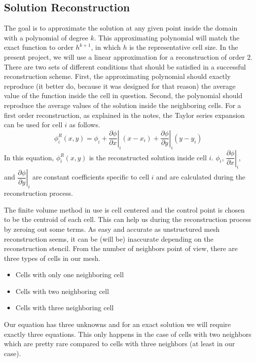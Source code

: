 \documentclass{article}
\begin{document}
\subsection{Solution Reconstruction}
The goal is to approximate the solution at any given point inside the domain with a polynomial of degree $k$. This approximating polynomial will match the exact function to order $h^{k+1}$, in which $h$ is the representative cell size. In the present project, we will use a linear approximation for a reconstruction of order 2. There are two sets of different conditions that should be satisfied in a successful reconstruction scheme. First, the approximating polynomial should exactly reproduce (it better do, because it was designed for that reason) the average value of the function inside the cell in question. Second, the polynomial should reproduce the average values of the solution inside the neighboring cells. For a first order reconstruction, as explained in the notes, the Taylor series expansion can be used for cell $i$ as follows.
\begin{equation}
\phi_i^R(x,y)=\phi_i + \left.\dfrac{\partial \phi}{\partial x}\right|_i (x-x_i) + \left.\dfrac{\partial \phi}{\partial y}\right|_i (y-y_i)
\end{equation}
In this equation, $\phi_i^R(x,y)$ is the reconstructed solution inside cell $i$. $\phi_i$, $\left.\dfrac{\partial \phi}{\partial x}\right|_i$, and $\left.\dfrac{\partial \phi}{\partial y}\right|_i$ are constant coefficients specific to cell $i$ and are calculated during the reconstruction process.

The finite volume method in use is cell centered and the control point is chosen to be the centroid of each cell. This can help us during the reconstruction process by zeroing out some terms. As easy and accurate as unstructured mesh reconstruction seems, it can be (will be) inaccurate depending on the reconstruction stencil. From the number of neighbors point of view, there are three types of cells in our mesh.
\begin{itemize}
\item Cells with only one neighboring cell
\item Cells with two neighboring cell
\item Cells with three neighboring cell
\end{itemize}
Our equation has three unknowns and for an exact solution we will require exactly three equations. This only happens in the case of cells with two neighbors which are pretty rare compared to cells with three neighbors (at least in our case).
\end{document}
